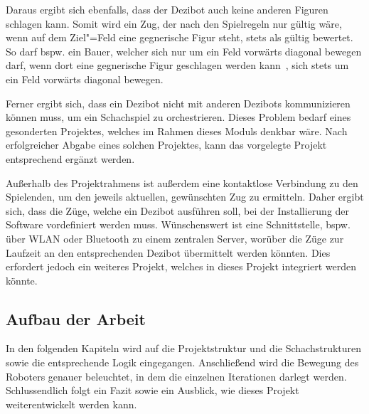 
Daraus ergibt sich ebenfalls, dass der Dezibot auch keine anderen Figuren schlagen kann. Somit wird ein Zug, der nach den Spielregeln nur gültig wäre, wenn auf dem Ziel"=Feld eine gegnerische Figur steht, stets als gültig bewertet. So darf bspw. ein Bauer, welcher sich nur um ein Feld vorwärts diagonal bewegen darf, wenn dort eine gegnerische Figur geschlagen werden kann~\cite{justUSChessFederations2019}, sich stets um ein Feld vorwärts diagonal bewegen.


Ferner ergibt sich, dass ein Dezibot nicht mit anderen Dezibots kommunizieren können muss, um ein Schachspiel zu orchestrieren. Dieses Problem bedarf eines gesonderten Projektes, welches im Rahmen dieses Moduls denkbar wäre. Nach erfolgreicher Abgabe eines solchen Projektes, kann das vorgelegte Projekt entsprechend ergänzt werden.


Außerhalb des Projektrahmens ist außerdem eine kontaktlose Verbindung zu den Spielenden, um den jeweils aktuellen, gewünschten Zug zu ermitteln. Daher ergibt sich, dass die Züge, welche ein Dezibot ausführen soll, bei der Installierung der Software vordefiniert werden muss. Wünschenswert ist eine Schnittstelle, bspw. über WLAN oder Bluetooth zu einem zentralen Server, worüber die Züge zur Laufzeit an den entsprechenden Dezibot übermittelt werden könnten. Dies erfordert jedoch ein weiteres Projekt, welches in dieses Projekt integriert werden könnte.


\subsection{Aufbau der Arbeit}

In den folgenden Kapiteln wird auf die Projektstruktur und die Schachstrukturen sowie die entsprechende Logik eingegangen. Anschließend wird die Bewegung des Roboters genauer beleuchtet, in dem die einzelnen Iterationen darlegt werden. Schlussendlich folgt ein Fazit sowie ein Ausblick, wie dieses Projekt weiterentwickelt werden kann.
